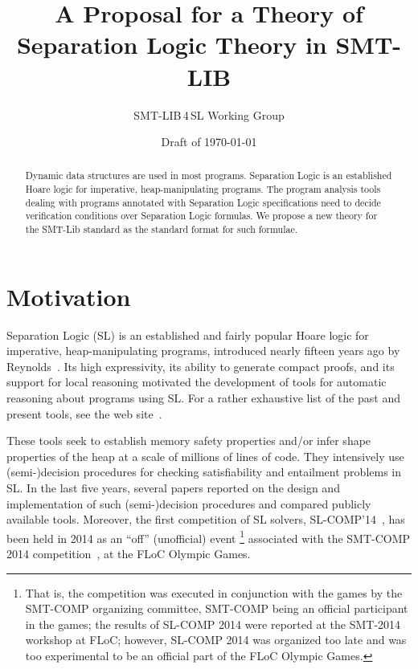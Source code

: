 \documentclass{llncs}
\title{A Proposal for a Theory of Separation Logic Theory in SMT-LIB}
\author{SMT-LIB\,4\,SL Working Group}
\institute{Draft of \today}
\date{Draft of \today}
\begin{document}
\sloppy
\maketitle


\begin{abstract}
Dynamic data structures are used in most programs. 
Separation Logic is an established Hoare logic for imperative, heap-manipulating programs.
The program analysis tools dealing with programs annotated with Separation Logic specifications need to decide verification conditions over Separation Logic formulas.
We propose a new theory for the SMT-Lib standard as the standard format for such formulae.
\end{abstract}




\section{Motivation}

Separation Logic (SL) is an established and fairly popular Hoare logic 
for imperative, heap-manipulating programs, 
introduced nearly fifteen years ago by Reynolds~\cite{Reynolds99,OHearnRY01,Reynolds02}. 
%
Its high expressivity, its ability to generate compact proofs, and 
its support for local reasoning 
motivated the development of tools for automatic reasoning about programs using SL.
For a rather exhaustive list of the past and present tools, see the web site~\cite{OHearn-SLsite}.

These tools seek to establish memory safety properties and/or infer shape properties of the heap at a scale of millions of lines of code.
They intensively use (semi-)decision procedures for checking satisfiability and entailment problems in SL.
In the last five years, several papers reported on the design and implementation of such (semi-)decision procedures and compared publicly available tools.
Moreover, the first competition of SL solvers, SL-COMP'14~\cite{SLCOMP14site}, has been held in 2014 as an ``off'' (unofficial) event \footnote{That is, the competition was executed in conjunction with the games by the SMT-COMP organizing committee, SMT-COMP being an official participant in the games; the results of SL-COMP 2014 were reported at the SMT-2014 workshop at FLoC; however, SL-COMP 2014 was organized too late and was too experimental to be an official part of the FLoC Olympic Games.}
associated with the SMT-COMP 2014 competition~\cite{SMTCOMPsite}, at the FLoC Olympic Games.
\end{document}

